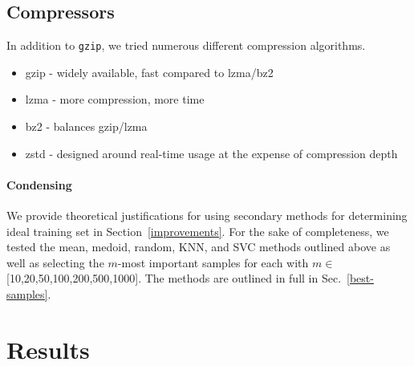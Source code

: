 \documentclass[conference]{IEEEtran}
\begin{document}
\subsection{Compressors} In addition to \texttt{gzip}, we tried numerous different compression algorithms. 
\begin{itemize}
    \item gzip - widely available, fast compared to lzma/bz2
    \item lzma - more compression, more time
    \item bz2 - balances gzip/lzma
    \item zstd - designed around real-time usage at the expense of compression depth
\end{itemize}

\paragraph{Condensing}
\label{condensing}
We provide theoretical justifications for using secondary methods for determining ideal training set in Section~\ref{improvements}. For the sake of completeness, we tested the mean, medoid, random, KNN, and SVC methods outlined above as well as selecting the $m$-most important samples for each with $m \in$ [10,20,50,100,200,500,1000]. The methods are outlined in full in Sec.~\ref{best-samples}.


\section{Results}
\label{results}
\end{document}
